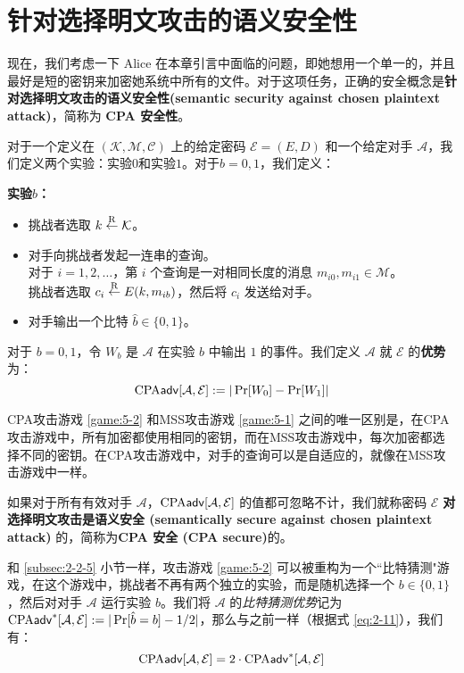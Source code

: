 \section{针对选择明文攻击的语义安全性}\label{sec:5-3}

现在，我们考虑一下 Alice 在本章引言中面临的问题，即她想用一个单一的，并且最好是短的密钥来加密她系统中所有的文件。对于这项任务，正确的安全概念是\textbf{针对选择明文攻击的语义安全性(semantic security against chosen plaintext attack)}，简称为 \textbf{CPA 安全性}。

\begin{game}[CPA安全性]\label{game:5-2}
对于一个定义在 $(\mathcal{K},\mathcal{M},\mathcal{C})$ 上的给定密码 $\mathcal{E}=(E,D)$ 和一个给定对手 $\mathcal{A}$，我们定义两个实验：实验$0$和实验$1$。对于$b=0,1$，我们定义：

\noindent\textbf{实验$b$：}
\begin{itemize}
	\item 挑战者选取 $k\overset{\rm R}\leftarrow\mathcal{K}$。
	\item 对手向挑战者发起一连串的查询。\\
    对于 $i = 1,2,\dots$，第 $i$ 个查询是一对相同长度的消息 $m_{i0},m_{i1}\in\mathcal{M}$。\\
    挑战者选取 $c_i\overset{\rm R}\leftarrow E(k,m_{ib})$，然后将 $c_i$ 发送给对手。
    \item 对手输出一个比特 $\hat{b}\in\{0,1\}$。
\end{itemize}

对于 $b=0,1$，令 $W_b$ 是 $\mathcal{A}$ 在实验 $b$ 中输出 $1$ 的事件。我们定义 $\mathcal{A}$ 就 $\mathcal{E}$ 的\textbf{优势}为：
\[
{\rm CPA}\mathsf{adv}[\mathcal{A}, \mathcal{E}]:=|\Pr[W_0]-\Pr[W_1]|
\]
\end{game}

CPA攻击游戏 \ref{game:5-2} 和MSS攻击游戏 \ref{game:5-1} 之间的唯一区别是，在CPA攻击游戏中，所有加密都使用相同的密钥，而在MSS攻击游戏中，每次加密都选择不同的密钥。在CPA攻击游戏中，对手的查询可以是自适应的，就像在MSS攻击游戏中一样。

\begin{definition}\label{def:5-2}
如果对于所有有效对手 $\mathcal{A}$，${\rm CPA}\mathsf{adv}[\mathcal{A}, \mathcal{E}]$ 的值都可忽略不计，我们就称密码 $\mathcal{E}$ \textbf{对选择明文攻击是语义安全 (semantically secure against chosen plaintext attack)} 的，简称为\textbf{CPA 安全 (CPA secure)}的。
\end{definition}

和 \ref{subsec:2-2-5} 小节一样，攻击游戏 \ref{game:5-2} 可以被重构为一个``比特猜测"游戏，在这个游戏中，挑战者不再有两个独立的实验，而是随机选择一个 $b\in\{0,1\}$，然后对对手 $\mathcal{A}$ 运行实验 $b$。我们将 $\mathcal{A}$ 的\emph{比特猜测优势}记为${\rm CPA}\mathsf{adv}^*[\mathcal{A}, \mathcal{E}]:=|\Pr[\hat{b}=b]-{1}/{2}|$，那么与之前一样（根据式 \ref{eq:2-11}），我们有：
\begin{equation}\label{eq:5-4}
{\rm CPA}\mathsf{adv}[\mathcal{A}, \mathcal{E}]=2\cdot{\rm CPA}\mathsf{adv}^*[\mathcal{A}, \mathcal{E}]
\end{equation}

